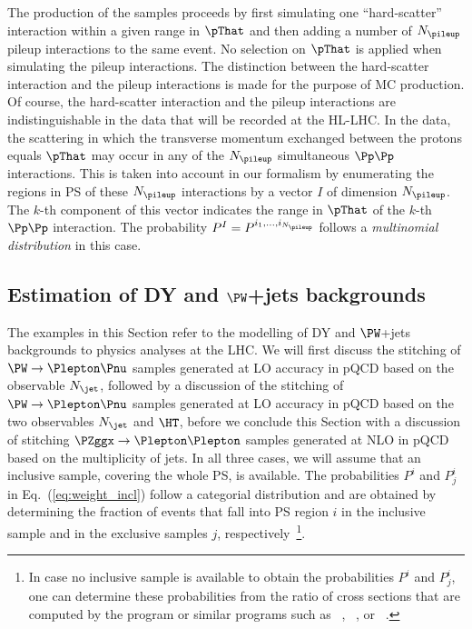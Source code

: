 The production of the samples proceeds by first simulating one ``hard-scatter'' interaction within a given range in $\pThat$
and then adding a number of $N_{\pileup}$ pileup interactions to the same event.
No selection on $\pThat$ is applied when simulating the pileup interactions.
The distinction between the hard-scatter interaction and the pileup interactions is made for the purpose of MC production.
Of course, the hard-scatter interaction and the pileup interactions are indistinguishable in the data that will be recorded at the HL-LHC.
In the data, the scattering in which the transverse momentum exchanged between the protons equals $\pThat$ may occur in any of the $N_{\pileup}$ simultaneous $\Pp\Pp$ interactions.
This is taken into account in our formalism by enumerating the regions in PS of these $N_{\pileup}$ interactions by a vector $I$ of dimension $N_{\pileup}$.
The $k$-th component of this vector indicates the range in $\pThat$ of the $k$-th $\Pp\Pp$ interaction.
The probability $P^{I} = P^{i_{1},\dots,i_{N_{\pileup}}}$ follows a {\em multinomial distribution} in this case.


\subsection{Estimation of DY and $\PW$+jets backgrounds}
\label{sec:examples_background_yield}

The examples in this Section refer to the modelling of DY and $\PW$+jets backgrounds to physics analyses at the LHC.
We will first discuss the stitching of $\PW \to \Plepton\Pnu$ samples generated at LO accuracy in pQCD based on the observable $N_{\jet}$, 
followed by a discussion of the stitching of $\PW \to \Plepton\Pnu$ samples generated at LO accuracy in pQCD based on the two observables $N_{\jet}$ and $\HT$,
before we conclude this Section with a discussion of stitching $\PZggx \to \Plepton\Plepton$ samples generated at NLO in pQCD based on the multiplicity of jets.
In all three cases, we will assume that an inclusive sample, covering the whole PS, is available.
The probabilities $P^{i}$ and $P_{j}^{i}$ in Eq.~(\ref{eq:weight_incl})
follow a categorial distribution and
are obtained by determining the fraction of events that fall into PS region $i$ in the inclusive sample and in the exclusive samples $j$, respectively~\footnote{
  In case no inclusive sample is available to obtain the probabilities $P^{i}$ and $P_{j}^{i}$,
  one can determine these probabilities from the ratio of cross sections that are computed by the program \MGvATNLO 
  or similar programs such as \POWHEG~\cite{Nason:2004rx,Frixione:2007vw,Alioli:2010xd}, \SHERPA~\cite{Gleisberg:2008ta}, or \ALPGEN~\cite{Mangano:2002ea}.}.

